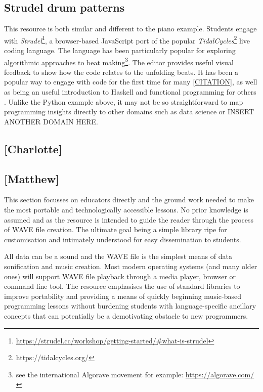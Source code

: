 \subsection{Strudel drum patterns}
This resource is both similar and different to the piano example. Students engage with \emph{Strudel}\footnote{\url{https://strudel.cc/workshop/getting-started/\#what-is-strudel}}, a browser-based JavaScript port of the popular \emph{TidalCycles}\footnote{https://tidalcycles.org/} live coding language. The language has been particularly popular for exploring algorithmic approaches to beat making\footnote{see the international Algorave movement for example: \url{https://algorave.com/}}. The editor provides useful visual feedback to show how the code relates to the unfolding beats. It has been a popular way to engage with code for the first time for many \ref{CITATION}, as well as being an useful introduction to Haskell and functional programming for others \cite{CITATION}. Unlike the Python example above, it may not be so straightforward to map programming insights directly to other domains such as data science or INSERT ANOTHER DOMAIN HERE.

\subsection{[Charlotte]}
% 

\subsection{[Matthew]}
This section focusses on educators directly and the ground work needed to make the most portable and technologically accessible lessons. No prior knowledge is assumed and as the resource is intended to guide the reader through the process of WAVE file creation. The ultimate goal being a simple library ripe for customisation and intimately understood for easy dissemination to students.

All data can be a sound and the WAVE file is the simplest means of data sonification and music creation. Most modern operating systems (and many older ones) will support WAVE file playback through a media player, browser or command line tool. The resource emphasises the use of standard libraries to improve portability and providing a means of quickly beginning music-based programming lessons without burdening students with language-specific ancillary concepts that can potentially be a demotivating obstacle to new programmers.

